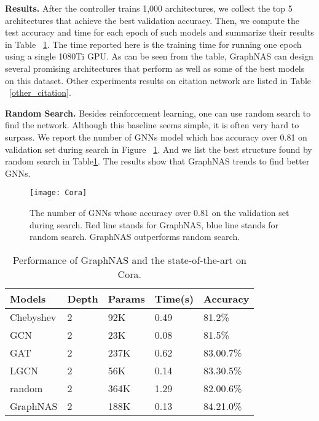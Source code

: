 \documentclass{article}
\begin{document}
\textbf{Results.} After the controller trains 1,000 architectures, we collect the top 5 architectures that achieve the best validation accuracy. Then, we compute the test accuracy and time for each epoch of such models and summarize their results in Table ~\ref{table:cora}. The time reported here is the training time for running one epoch using a single 1080Ti GPU. As can be seen from the table, GraphNAS can design several promising architectures that perform as well as some of the best models on this dataset.
Other experiments results on citation network are listed in Table ~\ref{other_citation}. 

\textbf{Random Search.} Besides reinforcement learning, one can use random search to find the network. Although this baseline seems simple, it is often very hard to surpass. We report the number of GNNs model which has accuracy over 0.81 on validation set during search in Figure ~\ref{fig:random}. And we list the best structure found by random search in Table\ref{table:cora}. The results show that GraphNAS trends to find better GNNs.
\begin{figure}
	\texttt{[image: Cora]}
	\caption{The number of GNNs whose accuracy over 0.81 on the validation set during search. Red line stands for GraphNAS, blue line stands for random search. GraphNAS outperforms random search. }
	\label{fig:random}
\end{figure}
\begin{table}[]
	\caption{Performance of GraphNAS and the state-of-the-art on Cora.}
	\label{table:cora}
	\begin{tabular}{l|ll|ll}
		\hline
		Models    & Depth & Params &  Time(s) & Accuracy   \\ \hline
		Chebyshev &   2    &      92K   & 0.49   & 81.2\%       \\
		GCN      &    2   &     23K & 0.08  & 81.5\%       \\
		GAT       &    2   &    237K & 0.62 & 83.00.7\% \\
		LGCN      &  2      &    56K        & 0.14 & 83.30.5\% \\ \hline
random & 2  &        364K          &	1.29		&82.00.6\%				\\
		GraphNAS   &  2   &  188K         &   0.13 &  84.21.0\%         \\ \hline
		
	\end{tabular}
\end{table}
\end{document}
